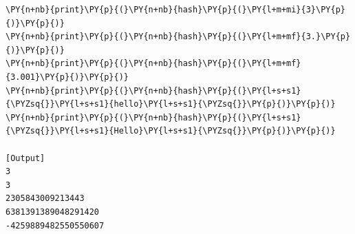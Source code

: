 \begin{Verbatim}[label=\makebox{\url{https://github.com/lucabaldini/cmepda/tree/master/slides/latex/snippets/hashing.py}},commandchars=\\\{\}]
\PY{n+nb}{print}\PY{p}{(}\PY{n+nb}{hash}\PY{p}{(}\PY{l+m+mi}{3}\PY{p}{)}\PY{p}{)}
\PY{n+nb}{print}\PY{p}{(}\PY{n+nb}{hash}\PY{p}{(}\PY{l+m+mf}{3.}\PY{p}{)}\PY{p}{)}
\PY{n+nb}{print}\PY{p}{(}\PY{n+nb}{hash}\PY{p}{(}\PY{l+m+mf}{3.001}\PY{p}{)}\PY{p}{)}
\PY{n+nb}{print}\PY{p}{(}\PY{n+nb}{hash}\PY{p}{(}\PY{l+s+s1}{\PYZsq{}}\PY{l+s+s1}{hello}\PY{l+s+s1}{\PYZsq{}}\PY{p}{)}\PY{p}{)}
\PY{n+nb}{print}\PY{p}{(}\PY{n+nb}{hash}\PY{p}{(}\PY{l+s+s1}{\PYZsq{}}\PY{l+s+s1}{Hello}\PY{l+s+s1}{\PYZsq{}}\PY{p}{)}\PY{p}{)}

[Output]
3
3
2305843009213443
6381391389048291420
-4259889482550550607
\end{Verbatim}